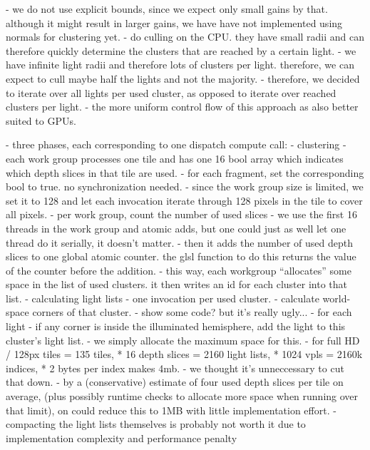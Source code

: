 - we do not use explicit bounds, since we expect only small gains by that. although it might result in larger gains, we have have not implemented using normals for clustering yet.
- \citet{???practical} do culling on the CPU. they have small radii and can therefore quickly determine the clusters that are reached by a certain light.
- we have infinite light radii and therefore lots of clusters per light. therefore, we can expect to cull maybe half the lights and not the majority.
- therefore, we decided to iterate over all lights per used cluster, as opposed to iterate over reached clusters per light.
- the more uniform control flow of this approach as also better suited to GPUs.


- three phases, each corresponding to one dispatch compute call:
    - clustering
        - each work group processes one tile and has one 16 bool array which indicates which depth slices in that tile are used.
        - for each fragment, set the corresponding bool to true. no synchronization needed.
        - since the work group size is limited, we set it to 128 and let each invocation iterate through 128 pixels in the tile to cover all pixels.
        - per work group, count the number of used slices
            - we use the first 16 threads in the work group and atomic adds, but one could just as well let one thread do it serially, it doesn't matter.
        - then it adds the number of used depth slices to one global atomic counter. the glsl function to do this returns the value of the counter before the addition.
        - this way, each workgroup ``allocates'' some space in the list of used clusters. it then writes an id for each cluster into that list.
    - calculating light lists
        - one invocation per used cluster.
        - calculate world-space corners of that cluster.
        - show some code? but it's really ugly...
        - for each light
            - if any corner is inside the illuminated hemisphere, add the light to this cluster's light list.
        - we simply allocate the maximum space for this.
            - for full HD / 128px tiles = 135 tiles, * 16 depth slices = 2160 light lists, * 1024 vpls = 2160k indices, * 2 bytes per index makes 4mb.
            - we thought it's unneccessary to cut that down.
            - by a (conservative) estimate of four used depth slices per tile on average, (plus possibly runtime checks to allocate more space when running over that limit), on could reduce this to 1MB with little implementation effort.
            - compacting the light lists themselves is probably not worth it due to implementation complexity and performance penalty
